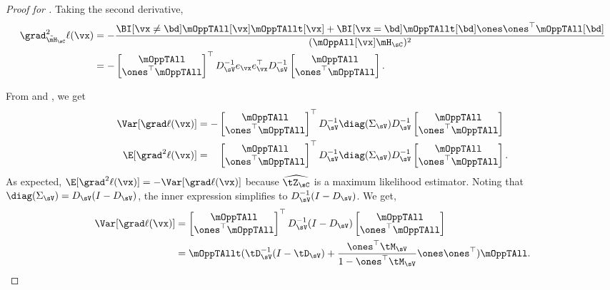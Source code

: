\begin{proof}[Proof for ]
Taking the second derivative,
\begin{align}
  \grad^2_{\tilde \mH_\sC} \ell(\vx)
  &= - \frac{\BI[\vx \neq \bd] \mOppTAll[\vx] \mOppTAllt[\vx] + \BI[\vx = \bd] \mOppTAllt[\bd] \ones \ones^\top \mOppTAll[\bd]}{(\mOppAll[\vx] \mH_\sC)^2} \nonumber \\
  &= - 
  \begin{bmatrix}
    \mOppTAll \\
    \ones^\top \mOppTAll
  \end{bmatrix}^\top
    D_{\sV}^{-1} e_\vx e_\vx^\top D_{\sV}^{-1} 
  \begin{bmatrix}
    \mOppTAll \\
    \ones^\top \mOppTAll
  \end{bmatrix}. \label{eqn:lhood-hess}%
\end{align}

From  and , we get
  \begin{align*}
    \Var [\grad \ell(\vx)] &= -
        \begin{bmatrix}
          \mOppTAll \\
          \ones^\top \mOppTAll
        \end{bmatrix}^\top
          D_{\sV}^{-1} \diag(\Sigma_\sV) D_{\sV}^{-1} 
        \begin{bmatrix}
          \mOppTAll \\
          \ones^\top \mOppTAll
        \end{bmatrix} \\
        \E[\grad^2 \ell(\vx)] 
        &= \hphantom{-}
        \begin{bmatrix}
          \mOppTAll \\
          \ones^\top \mOppTAll
        \end{bmatrix}^\top
          D_{\sV}^{-1} \diag(\Sigma_\sV) D_{\sV}^{-1} 
        \begin{bmatrix}
          \mOppTAll \\
          \ones^\top \mOppTAll
        \end{bmatrix}.
  \end{align*}
As expected, $\E[\grad^2 \ell(\vx)] = -\Var [\grad \ell(\vx)]$ because
$\widehat{\tZ_\sC}$ is a maximum likelihood estimator. 
Noting that $\diag(\Sigma_\sV) = D_\sV (I - D_\sV)$, the inner
  expression simplifies to $D_\sV^{-1} (I - D_\sV)$. We get,
\begin{align*}
  \Var [\grad \ell(\vx)] &=
      \begin{bmatrix}
        \mOppTAll \\
        \ones^\top \mOppTAll
      \end{bmatrix}^\top
        D_{\sV}^{-1} (I - D_\sV) 
      \begin{bmatrix}
        \mOppTAll \\
        \ones^\top \mOppTAll
      \end{bmatrix} \\
   &=
    \mOppTAllt (\tD_{\sV}^{-1} (I - \tD_\sV) + \frac{\ones^\top \tM_\sV}{1 - \ones^\top \tM_\sV} \ones\ones^\top) \mOppTAll.
\end{align*}


\end{proof}
